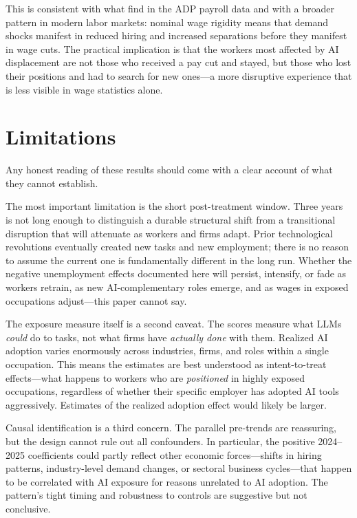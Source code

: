 \documentclass[11pt]{article}
\begin{document}
This is consistent with what \textcite{brynjolfsson2025canaries} find in the ADP payroll data and with a broader pattern in modern labor markets: nominal wage rigidity means that demand shocks manifest in reduced hiring and increased separations before they manifest in wage cuts. The practical implication is that the workers most affected by AI displacement are not those who received a pay cut and stayed, but those who lost their positions and had to search for new ones---a more disruptive experience that is less visible in wage statistics alone.

\section{Limitations}

Any honest reading of these results should come with a clear account of what they cannot establish.

The most important limitation is the short post-treatment window. Three years is not long enough to distinguish a durable structural shift from a transitional disruption that will attenuate as workers and firms adapt. Prior technological revolutions eventually created new tasks and new employment; there is no reason to assume the current one is fundamentally different in the long run. Whether the negative unemployment effects documented here will persist, intensify, or fade as workers retrain, as new AI-complementary roles emerge, and as wages in exposed occupations adjust---this paper cannot say.

The exposure measure itself is a second caveat. The \textcite{eloundou2024gpts} scores measure what LLMs \emph{could} do to tasks, not what firms have \emph{actually done} with them. Realized AI adoption varies enormously across industries, firms, and roles within a single occupation. This means the estimates are best understood as intent-to-treat effects---what happens to workers who are \emph{positioned} in highly exposed occupations, regardless of whether their specific employer has adopted AI tools aggressively. Estimates of the realized adoption effect would likely be larger.

Causal identification is a third concern. The parallel pre-trends are reassuring, but the design cannot rule out all confounders. In particular, the positive 2024--2025 coefficients could partly reflect other economic forces---shifts in hiring patterns, industry-level demand changes, or sectoral business cycles---that happen to be correlated with AI exposure for reasons unrelated to AI adoption. The pattern's tight timing and robustness to controls are suggestive but not conclusive.
\end{document}

